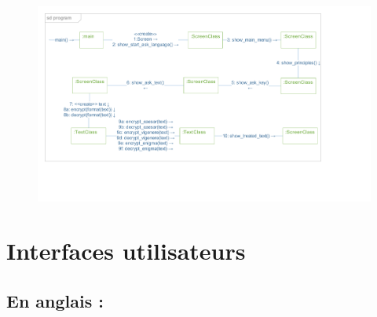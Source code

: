 \documentclass[a4paper,12pt,abstracton,titlepage]{scrartcl}
\begin{document}
\begin{figure}[tpbh]
	\centering
  \includegraphics[width=\textwidth, trim=0mm 30mm 30mm 0mm, clip]{./Diagrammes/diagrammeDeCommunication.pdf}
	\label{img:communication}
\end{figure}


\newpage
\section{Interfaces utilisateurs}

{
	\label{SP}
}

\subsection{En anglais :}
\end{document}
